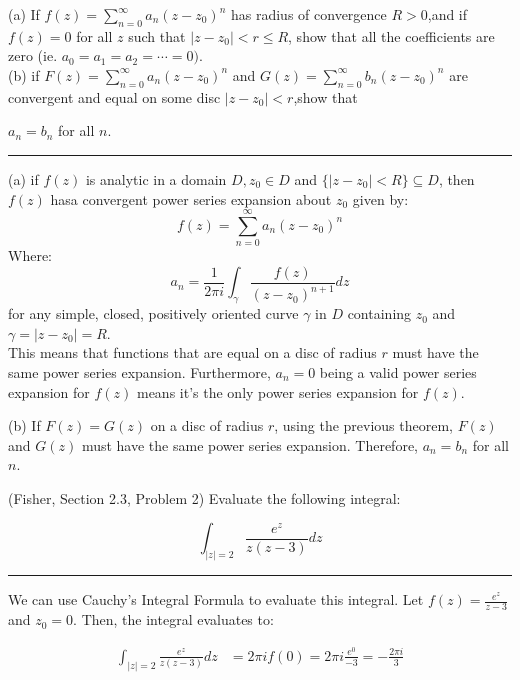 \begin{example}

    (a) If $f(z)=\sum_{n=0}^\infty a_n(z-z_0)^n$ has radius of convergence $R>0$,and if $f(z)=0$ for all $z$ such that $|z-z_0|<r\leq R$, show that all the coefficients are zero (ie. $a_0=a_1=a_2=\cdots=0).$
    \\
    (b) if $F(z)=\sum_{n=0}^\infty a_n(z-z_0)^n$ and $G(z)=\sum_{n=0}^\infty b_n(z-z_0)^n$ are convergent and equal on some disc $|z-z_0|<r$,show that

    $a_n=b_n$ for all $n.$

    \hrule
    \vspace{0.5cm}

    (a)     if $f(z)$ is analytic in a domain $D, z_0 \in D$ and $\{|z-z_0| < R\} \subseteq D$, then $f(z)$ hasa convergent power series expansion about $z_0$ given by:
    \begin{equation}
        f(z) = \sum_{n=0}^{\infty} a_n(z-z_0)^n
    \end{equation}
    Where:
    \begin{equation}
        a_n = \frac{1}{2\pi i} \int_{\gamma} \frac{f(z)}{(z-z_0)^{n+1}} dz
    \end{equation}
    for any simple, closed, positively oriented curve $\gamma$ in $D$ containing $z_0$ and $\gamma=|z-z_0| = R$.\\
    This means that functions that are equal on a disc of radius $r$ must have the same power series expansion. Furthermore, $a_n = 0$ being a valid power series expansion for $f(z)$ means it's the only power series expansion for $f(z)$.

    (b) If $F(z) = G(z)$ on a disc of radius $r$, using the previous theorem, $F(z)$ and $G(z)$ must have the same power series expansion. Therefore, $a_n = b_n$ for all $n$.
\end{example}

\begin{example}
    (Fisher, Section 2.3, Problem 2) Evaluate the following integral:

    $$\int_{|z|=2}\frac{e^z}{z(z-3)}dz$$

    \hrule
    \vspace{0.5cm}

    We can use Cauchy's Integral Formula to evaluate this integral. Let $f(z) = \frac{e^z}{z-3}$ and $z_0 = 0$. Then, the integral evaluates to:

    \begin{align*}
        \int_{|z|=2}\frac{e^z}{z(z-3)}dz & = 2\pi i f(0) = 2\pi i \frac{e^0}{-3} = -\frac{2\pi i}{3}
    \end{align*}
\end{example}

